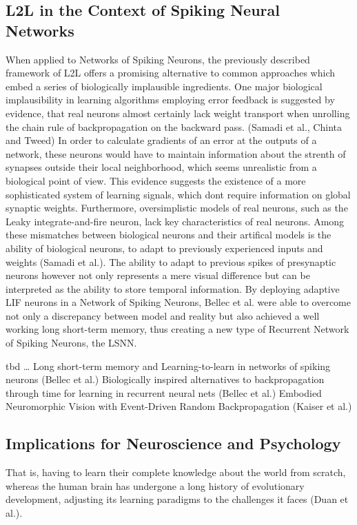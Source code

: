 \documentclass[letterpaper, 10 pt, conference]{ieeeconf}  %
\begin{document}
\subsection{L2L in the Context of Spiking Neural Networks}
When applied to Networks of Spiking Neurons, the previously described framework of L2L offers a promising alternative
to common approaches which embed a series of biologically implausible ingredients. One major biological implausibility
in learning algorithms employing error feedback is suggested by evidence, that real neurons almost certainly lack weight transport
when unrolling the chain rule of backpropagation on the backward pass. (Samadi et al., Chinta and Tweed) In order to calculate gradients
of an error at the outputs of a network, these neurons would have to maintain information about the strenth of synapses outside their local
neighborhood, which seems unrealistic from a biological point of view. This evidence suggests the existence of a more sophisticated 
system of learning signals, which dont require information on global synaptic weights. Furthermore, oversimplistic models of real
neurons, such as the Leaky integrate-and-fire neuron, lack key characteristics of real neurons. Among these mismatches between 
biological neurons and their artifical models is the ability of biological neurons, to adapt to previously experienced inputs
and weights (Samadi et al.). The ability to adapt to previous spikes of presynaptic neurons however not only represents a mere visual
difference but can be interpreted as the ability to store temporal information. \newline
By deploying adaptive LIF neurons in a Network of Spiking Neurons, Bellec et al. were able to overcome not only a 
discrepancy between model and reality but also achieved a well working long short-term memory, thus creating a new type of Recurrent
Network of Spiking Neurons, the LSNN. 




tbd \dots
Long short-term memory and Learning-to-learn in networks of spiking neurons (Bellec et al.)
Biologically inspired alternatives to backpropagation through time for learning in recurrent neural nets (Bellec et al.)
Embodied Neuromorphic Vision with Event-Driven Random Backpropagation (Kaiser et al.)

\subsection{Implications for Neuroscience and Psychology}
That is, having to learn their complete knowledge about the world from scratch, whereas the human brain has undergone a long history of evolutionary
development, adjusting its learning paradigms to the challenges it faces (Duan et al.). \newline
\end{document}
